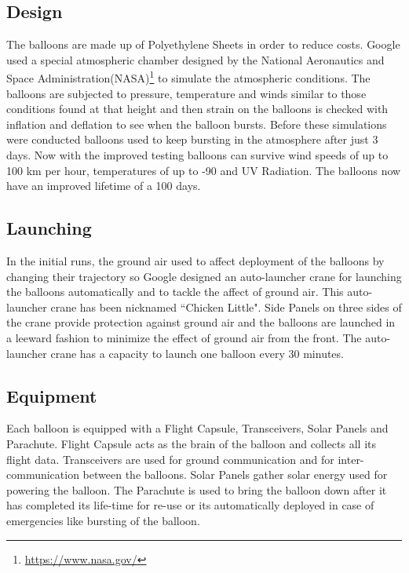 \documentclass{llncs}
\begin{document}
\subsection{Design}
The balloons are made up of Polyethylene Sheets in order to reduce costs. Google used a special atmospheric chamber designed by the National 
Aeronautics and Space Administration(NASA)\footnote{\url{https://www.nasa.gov/}} to simulate the atmospheric conditions. The balloons are 
subjected to pressure, temperature and winds similar to those conditions found at that height and then strain on the balloons is checked with 
inflation and deflation to see when the balloon bursts. Before these simulations were conducted balloons used to keep bursting in the 
atmosphere after just 3 days. Now with the improved testing balloons can survive wind speeds of up to 100 km per hour, temperatures of up to -90 and UV Radiation. The balloons now have an improved lifetime of a 100 days. 	
	
	\subsection{Launching}
	In the initial runs, the ground air used to affect deployment of the balloons by changing their trajectory so Google 
	designed an auto-launcher crane for launching the balloons automatically and to tackle the affect of ground air. 
	This auto-launcher crane has been nicknamed ``Chicken Little".
	Side Panels on three sides of the crane provide protection against ground air and the balloons are launched in a 
	leeward fashion to minimize the effect of ground air from the front. The auto-launcher crane has a capacity to 
	launch one balloon every 30 minutes.
	
	\subsection{Equipment}
	Each balloon is equipped with a Flight Capsule, Transceivers, Solar Panels and Parachute. Flight Capsule 
	acts as 
	the brain of the balloon and collects all its flight data. Transceivers are used for ground communication 
	and for 
	inter-communication between the balloons. Solar Panels gather solar energy used for powering the balloon. 
	The 
	Parachute is used to bring the balloon down after it has completed its life-time for re-use or its 
	automatically
	deployed in case of emergencies like bursting of the balloon. 
	
\end{document}
